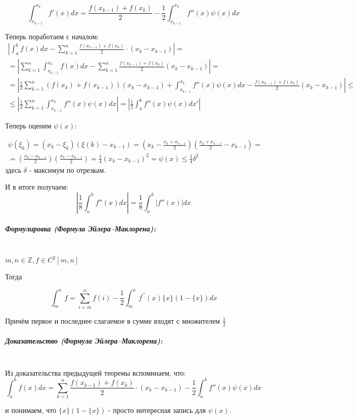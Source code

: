 \documentclass{article}
\let\vanillasubparagraph\subparagraph
\renewcommand{\subparagraph}[1]{\vanillasubparagraph{#1}\mbox{}\\}
\begin{document}
$$
\int_{x_{k-1}}^{x_k}f'(x)dx = \frac{f(x_{k-1}) + f(x_k)}{2} - \frac{1}{2}\int_{x_{k-1}}^{x_k}f''(x)\psi(x)dx
$$

Теперь поработаем с началом: 
\begin{multline*}
\left|\int_a^bf(x)dx - \sum_{k=1}^n \frac{f(x_{k-1}) + f(x_k)}{2} \cdot (x_k - x_{k-1})\right| = \\ =  \left|\sum_{k=1}^n\int_{x_{k-1}}^{x_k}f(x)dx - \sum_{k=1}^n \frac{f(x_{k-1}) + f(x_k)} {2} (x_k - x_{k-1})\right| = \\ = \left|\frac{1}{2} \sum_{k=1}^n (f(x_k) + f(x_{k-1}))(x_k-x_{k-1}) + \int_{x_{k-1}}^{x_k}f''(x) \psi(x)dx - \frac{f(x_{k-1}) + f(x_k)}{2}(x_k - x_{k-1})\right| \leq \\ \leq \left|\frac{1}{2}\sum_{k=1}^n\int_{x_{k-1}}^{x_k}f''(x)\psi(x)dx\right| = \left|\frac{1}{2} \int_a^bf''(x)\psi(x)dx'\right|
\end{multline*}

Теперь оценим $\psi(x)$:

\begin{multline*}
    \psi(\xi_k) = (x_k - \xi_k)(\xi(k) - x_{k-1}) = \left(x_k - \frac{x_k + x_{k-1}}{2}\right)\left(\frac{x_k  + x_{k-1}}{2} - x_{k-1}\right) = \\ = \left(\frac{x_k - x_{k-1}}{2}\right)\left(\frac{x_k - x_{k-1}}{2}\right) = \frac{1}{4} (x_k - x_{k-1})^2 = \psi(x) \leq \frac{1}{4}\delta^2
\end{multline*}
здесь $\delta$ - максимум по отрезкам.

И в итоге получаем: 
$$
\left|\frac{1}{8}\int_a^bf''(x)dx\right| = \frac{1}{8}\int_a^b|f''(x)|dx
$$

\subparagraph{Формулировка (Формула Эйлера--Маклорена):}

$m, n \in \mathbb{Z}, f \in C^2[m, n]$

Тогда 

\[\int_m^nf = \sum_{i = m}^n{f(i)} - \frac{1}{2}\int_m^n{f^{\prime\prime}(x)\{x\}(1 - \{x\})}dx\]

Причём первое и последнее слагаемое в сумме входят с множителем $\frac{1}{2}$

\subparagraph{Доказательство (Формула Эйлера--Маклорена):}

Из доказательства предыдущей теоремы вспоминаем, что: 
$$
\int_a^bf(x)dx = \sum_{k=1}^n\frac{f(x_{k-1}) + f(x_k)}{2} \cdot (x_k - x_{k-1}) - \frac{1}{2}\int_a^b f''(x) \psi(x)dx
$$

и понимаем, что $\{x\}(1-\{x\})$ - просто интересная запись для $\psi(x)$.
\end{document}
